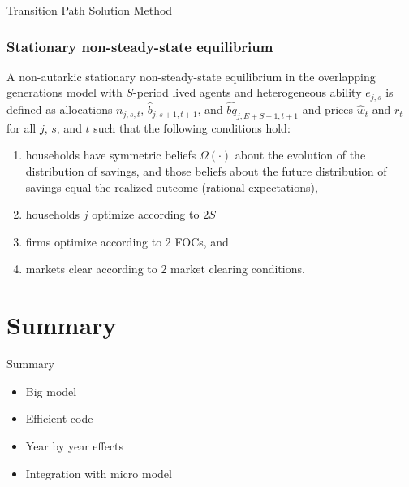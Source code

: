 \documentclass{beamer}
\begin{document}
  \begin{frame}{Transition Path Solution Method}\label{TPI Solution}
    \frametitle{Stationary non-steady-state equilibrium}
      \begin{definition}
        A non-autarkic stationary non-steady-state equilibrium in the overlapping generations model with $S$-period lived agents and heterogeneous ability $e_{j,s}$ is defined as allocations $n_{j,s,t}$, $\hat{b}_{j,s+1,t+1}$, and $\hat{bq}_{j,E+S+1,t+1}$ and prices $\hat{w}_t$ and $r_t$ for all $j$, $s$, and $t$ such that the following conditions hold:
        \begin{enumerate}
          \item households have symmetric beliefs $\Omega(\cdot)$ about the evolution of the distribution of savings, and those beliefs about the future distribution of savings equal the realized outcome (rational expectations),
          \item households $j$ optimize according to $2S$
          \item firms optimize according to 2 FOCs, and
          \item markets clear according to 2 market clearing conditions.
        \end{enumerate}
      \end{definition}
  \end{frame}



\section{Summary}
  \begin{frame}{Summary}
  \begin{itemize}
      \item Big model
      \item Efficient code
      \item Year by year effects
      \item Integration with micro model
  \end{itemize}
  \end{frame}
\end{document}
